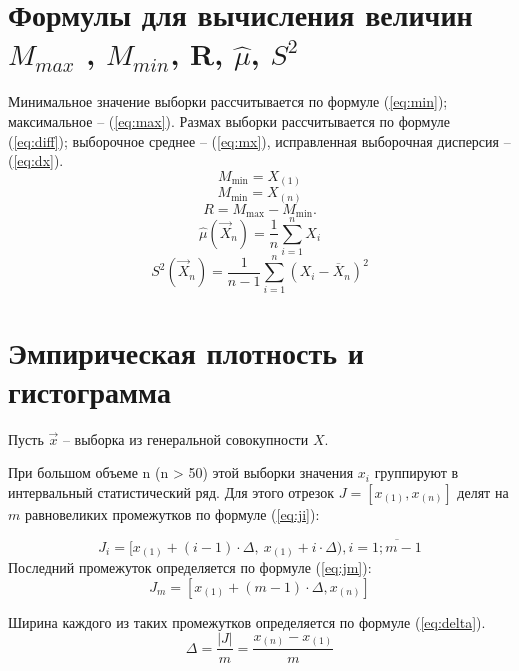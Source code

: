 \section{Формулы для вычисления величин $M_{max}$ , $M_{min}$, R, $\hat\mu$, $S^2$}
Минимальное значение выборки рассчитывается по формуле (\ref{eq:min}); максимальное -- (\ref{eq:max}). Размах выборки рассчитывается по формуле (\ref{eq:diff}); выборочное среднее -- (\ref{eq:mx}), исправленная выборочная дисперсия -- (\ref{eq:dx}).
\begin{equation}
	\label{eq:min}
	M_{\min} = X_{(1)}
\end{equation}
\begin{equation}
	\label{eq:max}
	M_{\min} = X_{(n)}
\end{equation}
\begin{equation}
	\label{eq:diff}
	R = M_{\max} - M_{\min}.
\end{equation}
\begin{equation}
	\label{eq:mx}
	\hat\mu(\vec X_n) = \frac 1n \sum_{i=1}^n X_i
\end{equation}
\begin{equation}
	\label{eq:dx}
	S^2(\vec X_n) = \frac 1{n - 1} \sum_{i=1}^n (X_i-\overline X_n)^2
\end{equation}

\section{Эмпирическая плотность и гистограмма}
Пусть $\vec x$ -- выборка из генеральной совокупности $X$. 

При большом объеме n (n > 50) этой выборки  значения $x_i$ группируют в интервальный статистический ряд. Для этого отрезок $J = [x_{(1)}, x_{(n)}]$ делят на $m$ равновеликих промежутков по формуле (\ref{eq:ji}):

\begin{equation}
	\label{eq:ji}
	J_i = [x_{(1)} + (i - 1) \cdot \Delta,\ x_{(1)} + i \cdot \Delta), i = \overline{1; m - 1}
\end{equation}
Последний промежуток определяется по формуле (\ref{eq:jm}):
\begin{equation}
	\label{eq:jm}
	J_{m} = [x_{(1)} + (m - 1) \cdot \Delta, x_{(n)}]
\end{equation}

Ширина каждого из таких промежутков определяется по формуле (\ref{eq:delta}).
\begin{equation}
	\label{eq:delta}
	\Delta = \frac{|J|}{m} = \frac{x_{(n)} - x_{(1)}}{m}
\end{equation}


